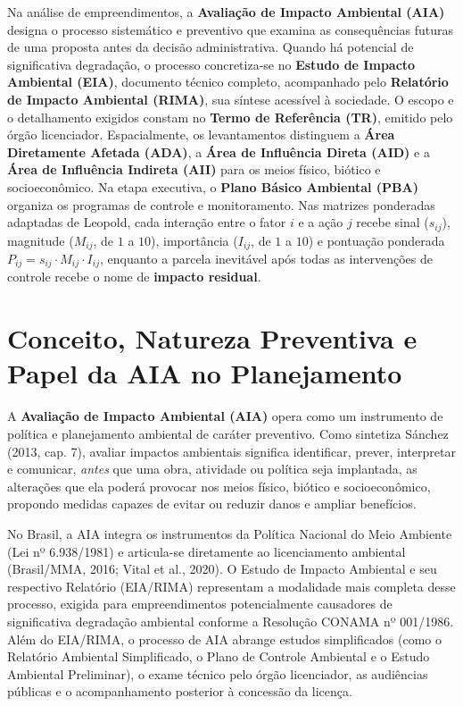 \begin{boxSimbolo}
  Na análise de empreendimentos, a \textbf{Avaliação de Impacto Ambiental (AIA)} designa o processo sistemático e preventivo que examina as consequências futuras de uma proposta antes da decisão administrativa. Quando há potencial de significativa degradação, o processo concretiza-se no \textbf{Estudo de Impacto Ambiental (EIA)}, documento técnico completo, acompanhado pelo \textbf{Relatório de Impacto Ambiental (RIMA)}, sua síntese acessível à sociedade. O escopo e o detalhamento exigidos constam no \textbf{Termo de Referência (TR)}, emitido pelo órgão licenciador. Espacialmente, os levantamentos distinguem a \textbf{Área Diretamente Afetada (ADA)}, a \textbf{Área de Influência Direta (AID)} e a \textbf{Área de Influência Indireta (AII)} para os meios físico, biótico e socioeconômico. Na etapa executiva, o \textbf{Plano Básico Ambiental (PBA)} organiza os programas de controle e monitoramento. Nas matrizes ponderadas adaptadas de Leopold, cada interação entre o fator $i$ e a ação $j$ recebe sinal ($s_{ij}$), magnitude ($M_{ij}$, de $1$ a $10$), importância ($I_{ij}$, de $1$ a $10$) e pontuação ponderada $P_{ij} = s_{ij} \cdot M_{ij} \cdot I_{ij}$, enquanto a parcela inevitável após todas as intervenções de controle recebe o nome de \textbf{impacto residual}.
\end{boxSimbolo}

\section{Conceito, Natureza Preventiva e Papel da AIA no Planejamento}

A \textbf{Avaliação de Impacto Ambiental (AIA)} opera como um instrumento de política e planejamento ambiental de caráter preventivo. Como sintetiza Sánchez (2013, cap. 7), avaliar impactos ambientais significa identificar, prever, interpretar e comunicar, \emph{antes} que uma obra, atividade ou política seja implantada, as alterações que ela poderá provocar nos meios físico, biótico e socioeconômico, propondo medidas capazes de evitar ou reduzir danos e ampliar benefícios.

No Brasil, a AIA integra os instrumentos da Política Nacional do Meio Ambiente (Lei nº 6.938/1981) e articula-se diretamente ao licenciamento ambiental (Brasil/MMA, 2016; Vital et al., 2020). O Estudo de Impacto Ambiental e seu respectivo Relatório (EIA/RIMA) representam a modalidade mais completa desse processo, exigida para empreendimentos potencialmente causadores de significativa degradação ambiental conforme a Resolução CONAMA nº 001/1986. Além do EIA/RIMA, o processo de AIA abrange estudos simplificados (como o Relatório Ambiental Simplificado, o Plano de Controle Ambiental e o Estudo Ambiental Preliminar), o exame técnico pelo órgão licenciador, as audiências públicas e o acompanhamento posterior à concessão da licença.

